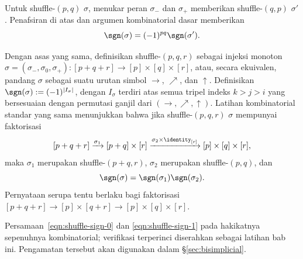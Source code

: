 Untuk shuffle-$(p,q)$ $\sigma$, menukar peran $\sigma_-$ dan $\sigma_+$
memberikan shuffle-$(q,p)$ $\sigma'$. Penafsiran di atas dan argumen
kombinatorial dasar memberikan
\begin{equation}\label{eqn:shuffle-sign-0}
	\sgn(\sigma) = (-1)^{pq} \sgn(\sigma').
\end{equation}

Dengan asas yang sama, definisikan shuffle-$(p,q,r)$ sebagai injeksi monoton
$\sigma=(\sigma_-,\sigma_0,\sigma_+):[p+q+r]\to[p]\times[q]\times[r]$,
atau, secara ekuivalen, pandang $\sigma$ sebagai suatu urutan simbol
$\rightarrow$, $\nearrow$, dan $\uparrow$. Definisikan
$\sgn(\sigma):=(-1)^{|I_\sigma|}$, dengan $I_\sigma$ terdiri atas semua
tripel indeks $k>j>i$ yang bersesuaian dengan permutasi ganjil dari
$(\rightarrow,\nearrow,\uparrow)$. Latihan kombinatorial standar yang sama
menunjukkan bahwa jika shuffle-$(p,q,r)$ $\sigma$ mempunyai faktorisasi
\[ [p+q+r] \xrightarrow{\sigma_1} [p+q] \times [r] \xrightarrow{\sigma_2 \times \identity_{[r]}} [p] \times [q] \times [r], \]
maka $\sigma_1$ merupakan shuffle-$(p+q,r)$, $\sigma_2$ merupakan
shuffle-$(p,q)$, dan
\begin{equation}\label{eqn:shuffle-sign-1}
	\sgn(\sigma) = \sgn(\sigma_1) \sgn(\sigma_2).
\end{equation}
Pernyataan serupa tentu berlaku bagi faktorisasi
$[p+q+r]\to[p]\times[q+r]\to[p]\times[q]\times[r]$.

Persamaan~\eqref{eqn:shuffle-sign-0} dan
\eqref{eqn:shuffle-sign-1} pada hakikatnya sepenuhnya kombinatorial;
verifikasi terperinci diserahkan sebagai latihan bab ini. Pengamatan tersebut
akan digunakan dalam \S\ref{sec:bisimplicial}.
